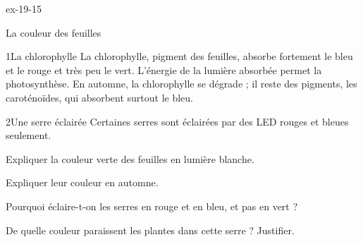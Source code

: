 \begin{blocLivre}{ex-19-15}
\begin{exercice}[3]{La couleur des feuilles}
\begin{docu}{1}{La chlorophylle}
La chlorophylle, pigment des feuilles, absorbe fortement le bleu et le rouge et très peu le vert. L'énergie de la lumière absorbée
permet la photosynthèse. En automne, la chlorophylle se dégrade ; il reste des pigments, les caroténoïdes, qui absorbent surtout le bleu.
\end{docu}
\begin{docu}{2}{Une serre éclairée}
Certaines serres sont éclairées par des LED rouges et bleues seulement.
\end{docu}
\begin{questions}
\item Expliquer la couleur verte des feuilles en lumière blanche.
\item Expliquer leur couleur en automne.
\item \initiative Pourquoi éclaire-t-on les serres en rouge et en bleu, et pas en vert ?
\item De quelle couleur paraissent les plantes dans cette serre ? Justifier.
\end{questions}
\end{exercice}
\end{blocLivre}
